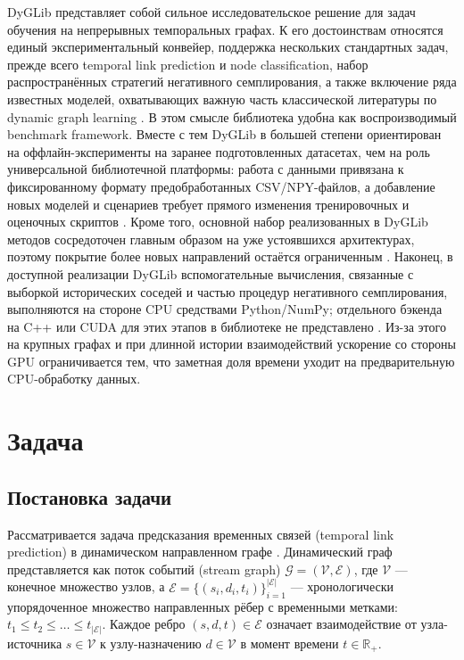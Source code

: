 \documentclass[a4paper,12pt]{extarticle}
\begin{document}
DyGLib представляет собой сильное исследовательское решение для задач обучения на непрерывных темпоральных графах. К его достоинствам относятся единый
  экспериментальный конвейер, поддержка нескольких стандартных задач, прежде всего temporal link prediction и node classification, набор распространённых стратегий
  негативного семплирования, а также включение ряда известных моделей, охватывающих важную часть классической литературы по dynamic graph learning
  \cite{dyglib_openreview,dyglib_github}. В этом смысле библиотека удобна как воспроизводимый benchmark framework. Вместе с тем DyGLib в большей степени
  ориентирован на оффлайн-эксперименты на заранее подготовленных датасетах, чем на роль универсальной библиотечной платформы: работа с данными привязана к
  фиксированному формату предобработанных CSV/NPY-файлов, а добавление новых моделей и сценариев требует прямого изменения тренировочных и оценочных скриптов
  \cite{dyglib_github}. Кроме того, основной набор реализованных в DyGLib методов сосредоточен главным образом на уже устоявшихся архитектурах, поэтому покрытие
  более новых направлений остаётся ограниченным \cite{dyglib_github}. Наконец, в доступной реализации DyGLib вспомогательные вычисления, связанные с выборкой
  исторических соседей и частью процедур негативного семплирования, выполняются на стороне CPU средствами Python/NumPy; отдельного бэкенда на C++ или CUDA для
  этих этапов в библиотеке не представлено \cite{dyglib_github}. Из-за этого на крупных графах и при длинной истории взаимодействий ускорение со стороны GPU
  ограничивается тем, что заметная доля времени уходит на предварительную CPU-обработку данных.

\newpage

\section{Задача}

\subsection{Постановка задачи}

Рассматривается задача предсказания временных связей (temporal link prediction) в динамическом направленном графе \cite{kazemi2020representation, longa2023graph}. Динамический граф представляется как поток событий (stream graph) $\mathcal{G} = (\mathcal{V}, \mathcal{E})$, где $\mathcal{V}$ — конечное множество узлов, а $\mathcal{E} = \{(s_i, d_i, t_i)\}_{i=1}^{|\mathcal{E}|}$ — хронологически упорядоченное множество направленных рёбер с временными метками: $t_1 \leq t_2 \leq \dots \leq t_{|\mathcal{E}|}$. Каждое ребро $(s, d, t) \in \mathcal{E}$ означает взаимодействие от узла-источника $s \in \mathcal{V}$ к узлу-назначению $d \in \mathcal{V}$ в момент времени $t \in \mathbb{R}_{+}$.
\end{document}
